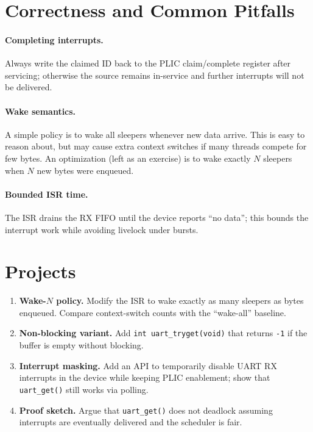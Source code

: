 

\section{Correctness and Common Pitfalls}

\paragraph{Completing interrupts.}
Always write the claimed ID back to the PLIC claim/complete register after servicing; otherwise the
source remains in-service and further interrupts will not be delivered.

\paragraph{Wake semantics.}
A simple policy is to wake all sleepers whenever new data arrive. This is easy to reason about, but
may cause extra context switches if many threads compete for few bytes. An optimization (left as an
exercise) is to wake exactly $N$ sleepers when $N$ new bytes were enqueued.

\paragraph{Bounded ISR time.}
The ISR drains the RX FIFO until the device reports “no data”; this bounds the interrupt work while
avoiding livelock under bursts.

\section*{Projects}

\begin{enumerate}
  \item \textbf{Wake-$N$ policy.} Modify the ISR to wake exactly as many sleepers as bytes enqueued.
        Compare context-switch counts with the “wake-all” baseline.
  \item \textbf{Non-blocking variant.} Add \texttt{int uart\_tryget(void)} that returns \texttt{-1}
        if the buffer is empty without blocking.
  \item \textbf{Interrupt masking.} Add an API to temporarily disable UART RX interrupts in the
        device while keeping PLIC enablement; show that \texttt{uart\_get()} still works via polling.
  \item \textbf{Proof sketch.} Argue that \texttt{uart\_get()} does not deadlock assuming interrupts
        are eventually delivered and the scheduler is fair.
\end{enumerate}
